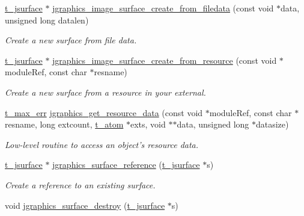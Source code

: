 \begin{DoxyCompactItemize}
\hyperlink{group__jsurface_ga9ced037ee8d6676fcd561e1d3420c28b}{t\_\-jsurface} $\ast$ \hyperlink{group__jsurface_ga47be6691ef1b94e86e7783e7ce38ebe9}{jgraphics\_\-image\_\-surface\_\-create\_\-from\_\-filedata} (const void $\ast$data, unsigned long datalen)
\begin{DoxyCompactList}\small\item\em Create a new surface from file data. \item\end{DoxyCompactList}\item 
\hyperlink{group__jsurface_ga9ced037ee8d6676fcd561e1d3420c28b}{t\_\-jsurface} $\ast$ \hyperlink{group__jsurface_gabb5d09a9d36912e1685bad2799992117}{jgraphics\_\-image\_\-surface\_\-create\_\-from\_\-resource} (const void $\ast$moduleRef, const char $\ast$resname)
\begin{DoxyCompactList}\small\item\em Create a new surface from a resource in your external. \item\end{DoxyCompactList}\item 
\hyperlink{group__datatypes_ga73edaae82b318855cc09fac994918165}{t\_\-max\_\-err} \hyperlink{group__jsurface_gacdc136f6f6a54c8a8a825ba5cb708683}{jgraphics\_\-get\_\-resource\_\-data} (const void $\ast$moduleRef, const char $\ast$resname, long extcount, \hyperlink{structt__atom}{t\_\-atom} $\ast$exts, void $\ast$$\ast$data, unsigned long $\ast$datasize)
\begin{DoxyCompactList}\small\item\em Low-\/level routine to access an object's resource data. \item\end{DoxyCompactList}\item 
\hyperlink{group__jsurface_ga9ced037ee8d6676fcd561e1d3420c28b}{t\_\-jsurface} $\ast$ \hyperlink{group__jsurface_gaf0948809cb6cc018e9f23e404ea9d271}{jgraphics\_\-surface\_\-reference} (\hyperlink{group__jsurface_ga9ced037ee8d6676fcd561e1d3420c28b}{t\_\-jsurface} $\ast$s)
\begin{DoxyCompactList}\small\item\em Create a reference to an existing surface. \item\end{DoxyCompactList}\item 
void \hyperlink{group__jsurface_ga0fb843ca88d59c3a1c933b18cca41524}{jgraphics\_\-surface\_\-destroy} (\hyperlink{group__jsurface_ga9ced037ee8d6676fcd561e1d3420c28b}{t\_\-jsurface} $\ast$s)
$$
\end{DoxyCompactItemize}
